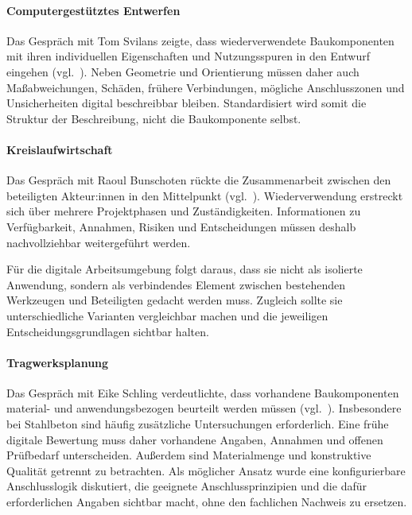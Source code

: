 \documentclass[type=zwischenbericht,theme=dark]{zukunftbau}
\begin{document}
\begin{SemioNest}
\begin{SemioNest}
\paragraph{Computergestütztes Entwerfen}
Das Gespräch mit Tom Svilans zeigte, dass wiederverwendete Baukomponenten mit ihren individuellen Eigenschaften und Nutzungsspuren in den Entwurf eingehen (vgl.\ ). Neben Geometrie und Orientierung müssen daher auch Maßabweichungen, Schäden, frühere Verbindungen, mögliche Anschlusszonen und Unsicherheiten digital beschreibbar bleiben. Standardisiert wird somit die Struktur der Beschreibung, nicht die Baukomponente selbst.

\paragraph{Kreislaufwirtschaft}
Das Gespräch mit Raoul Bunschoten rückte die Zusammenarbeit zwischen den beteiligten Akteur:innen in den Mittelpunkt (vgl.\ ). Wiederverwendung erstreckt sich über mehrere Projektphasen und Zuständigkeiten. Informationen zu Verfügbarkeit, Annahmen, Risiken und Entscheidungen müssen deshalb nachvollziehbar weitergeführt werden.

Für die digitale Arbeitsumgebung folgt daraus, dass sie nicht als isolierte Anwendung, sondern als verbindendes Element zwischen bestehenden Werkzeugen und Beteiligten gedacht werden muss. Zugleich sollte sie unterschiedliche Varianten vergleichbar machen und die jeweiligen Entscheidungsgrundlagen sichtbar halten.

\paragraph{Tragwerksplanung}
Das Gespräch mit Eike Schling verdeutlichte, dass vorhandene Baukomponenten material- und anwendungsbezogen beurteilt werden müssen (vgl.\ ). Insbesondere bei Stahlbeton sind häufig zusätzliche Untersuchungen erforderlich. Eine frühe digitale Bewertung muss daher vorhandene Angaben, Annahmen und offenen Prüfbedarf unterscheiden. Außerdem sind Materialmenge und konstruktive Qualität getrennt zu betrachten. Als möglicher Ansatz wurde eine konfigurierbare Anschlusslogik diskutiert, die geeignete Anschlussprinzipien und die dafür erforderlichen Angaben sichtbar macht, ohne den fachlichen Nachweis zu ersetzen.
\end{SemioNest}
\end{SemioNest}
\end{document}
